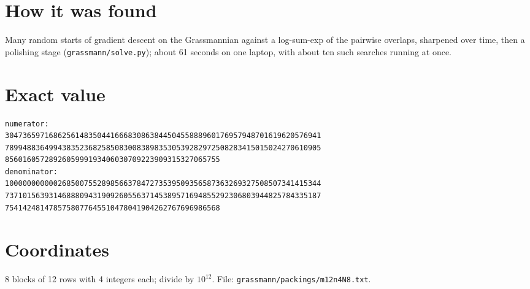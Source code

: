 \documentclass[11pt,a4paper]{article}
\begin{document}
\section{How it was found}
Many random starts of gradient descent on the Grassmannian against a log-sum-exp of the pairwise overlaps, sharpened over time, then a polishing stage (\texttt{grassmann/solve.py}); about 61 seconds on one laptop, with about ten such searches running at once.


\appendix
\section{Exact value}
{\small
\begin{verbatim}
numerator:
304736597168625614835044166683086384450455888960176957948701619620576941
789948836499438352368258508300838983530539282972508283415015024270610905
8560160572892605999193406030709223909315327065755
denominator:
100000000000268500755289856637847273539509356587363269327508507341415344
737101563931468880943190926055637145389571694855292306803944825784335187
7541424814785758077645510478041904262767696986568
\end{verbatim}}

\section{Coordinates}
8 blocks of 12 rows with 4 integers each; divide by $10^{12}$. File: \texttt{grassmann/packings/m12n4N8.txt}.
{\tiny
\begin{multicols}{3}
\end{multicols}}
\end{document}
